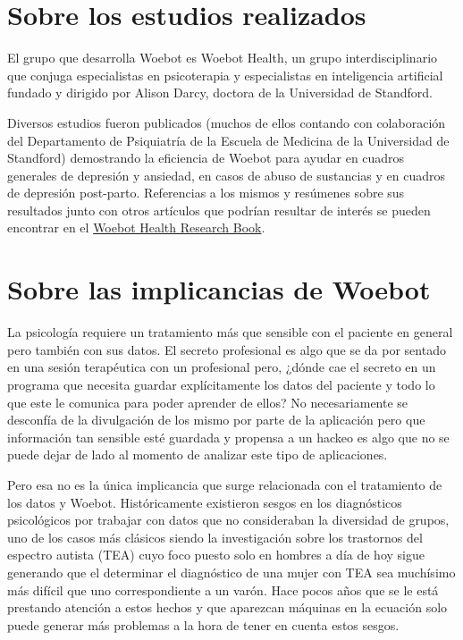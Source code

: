 \documentclass[11pt]{article}
\begin{document}

\section{Sobre los estudios realizados}
El grupo que desarrolla Woebot es Woebot Health, un grupo interdisciplinario que conjuga especialistas en psicoterapia y especialistas en inteligencia artificial fundado y dirigido por Alison Darcy, doctora de la Universidad de Standford.

Diversos estudios fueron publicados (muchos de ellos contando con colaboración del Departamento de Psiquiatría de la Escuela de Medicina de la Universidad de Standford) demostrando la eficiencia de Woebot para ayudar en cuadros generales de depresión y ansiedad, en casos de abuso de sustancias y en cuadros de depresión post-parto.
Referencias a los mismos y resúmenes sobre sus resultados 
junto con otros artículos que podrían resultar de interés
se pueden encontrar en el \href{https://woebothealth.com/img/2021/05/Woebot-Health-Research-Bibliography_May-2021-1-1.pdf}{Woebot Health Research Book}.

\section{Sobre las implicancias de Woebot}

La psicología requiere un tratamiento más que sensible
con el paciente en general pero también con sus datos.
El secreto profesional es algo que se da por sentado en
una sesión terapéutica con un profesional pero, ¿dónde cae
el secreto en un programa que necesita guardar explícitamente
los datos del paciente y todo lo que este le comunica
para poder aprender de ellos? No necesariamente se desconfía
de la divulgación de los mismo por parte de la aplicación
pero que información tan sensible esté guardada y propensa a
un hackeo es algo que no se puede dejar de lado al momento
de analizar este tipo de aplicaciones.

Pero esa no es la única implicancia que surge relacionada
con el tratamiento de los datos y Woebot. Históricamente 
existieron sesgos en los diagnósticos psicológicos por 
trabajar con datos que no consideraban la diversidad de
grupos, uno de los casos más clásicos siendo la 
investigación sobre los trastornos del espectro autista
(TEA)
cuyo foco puesto solo en hombres a día de hoy sigue 
generando que el determinar el diagnóstico de una 
mujer con TEA sea muchísimo más difícil que uno
correspondiente a un varón. Hace pocos años que 
se le está prestando atención a estos hechos y 
que aparezcan máquinas
en la ecuación solo puede generar más problemas a la 
hora de tener en cuenta estos sesgos. 
\end{document}

